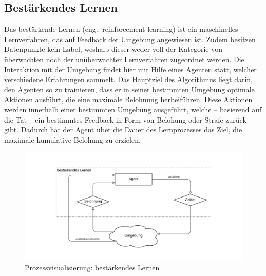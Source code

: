 \subsection{Bestärkendes Lernen}
Das bestärkende Lernen (eng.: reinforcement learning) ist ein maschinelles Lernverfahren, das auf Feedback der Umgebung angewiesen ist. Zudem besitzen Datenpunkte kein Label, weshalb dieser weder voll der Kategorie von überwachten noch der unüberwachter Lernverfahren zugeordnet werden. Die Interaktion mit der Umgebung findet hier mit Hilfe eines Agenten statt, welcher verschiedene Erfahrungen sammelt. Das Hauptziel des Algorithmus liegt darin, den Agenten so zu trainieren, dass er in seiner bestimmten Umgebung optimale Aktionen ausführt, die eine maximale Belohnung herbeiführen. Diese Aktionen werden innerhalb einer bestimmten Umgebung ausgeführt, welche -- basierend auf die Tat -- ein bestimmtes Feedback in Form von Belohung oder Strafe zurück gibt. Dadurch hat der Agent über die Dauer des Lernprozesses das Ziel, die maximale kumulative Belohung zu erzielen.
\begin{figure}[H]\label{img:reinforcementworkflow}
	\hspace{-10mm}
	\centering
	\includegraphics[width=0.8\linewidth]{Bilder/ReinforcementLearning.png}
	\caption{Prozessvisualisierung: bestärkendes Lernen}
\end{figure}